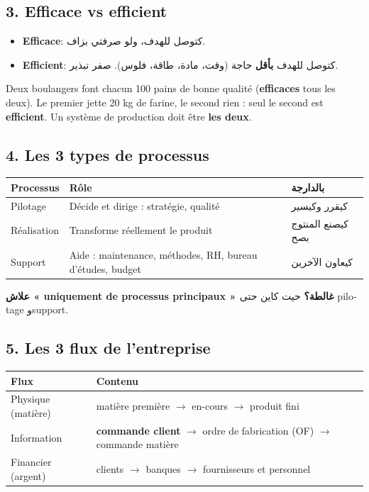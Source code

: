 \documentclass[11pt,a4paper]{article}
\newcommand{\ar}[1]{\textarabic{#1}}
\newcommand{\fr}[1]{\textfrench{#1}}
\begin{document}
\subsection*{3. Efficace vs efficient}
\par\begin{Arabic}
\begin{itemize}
\item \textbf{\fr{Efficace}}: كتوصل للهدف، ولو صرفتي بزاف.
\item \textbf{\fr{Efficient}}: كتوصل للهدف \textbf{بأقل} حاجة (وقت، مادة، طاقة، فلوس). صفر تبذير.
\end{itemize}
\end{Arabic}
\begin{exemple}
Deux boulangers font chacun 100 pains de bonne qualité (\textbf{efficaces} tous les deux). Le premier jette 20 kg de farine, le second rien : seul le second est \textbf{efficient}. Un système de production doit être \textbf{les deux}.
\end{exemple}

\subsection*{4. Les 3 types de processus}
\begin{center}
\begin{tabularx}{\linewidth}{l X >{\raggedleft\arraybackslash}X}
\toprule
\textbf{Processus} & \textbf{Rôle} & \ar{\textbf{بالدارجة}} \\
\midrule
Pilotage & Décide et dirige : stratégie, qualité & \ar{كيقرر وكيسير} \\
Réalisation & Transforme réellement le produit & \ar{كيصنع المنتوج بصح} \\
Support & Aide : maintenance, méthodes, RH, bureau d'études, budget & \ar{كيعاون الآخرين} \\
\bottomrule
\end{tabularx}
\end{center}
\par\begin{Arabic}
\textbf{علاش « \fr{uniquement de processus principaux} » غالطة؟} حيت كاين حتى \fr{pilotage} و\fr{support}.
\end{Arabic}

\subsection*{5. Les 3 flux de l'entreprise}
\begin{center}
\begin{tabularx}{\linewidth}{l X}
\toprule
\textbf{Flux} & \textbf{Contenu} \\
\midrule
Physique (matière) & matière première $\rightarrow$ en-cours $\rightarrow$ produit fini \\
Information & \textbf{commande client} $\rightarrow$ ordre de fabrication (OF) $\rightarrow$ commande matière \\
Financier (argent) & clients $\rightarrow$ banques $\rightarrow$ fournisseurs et personnel \\
\bottomrule
\end{tabularx}
\end{center}
\end{document}
